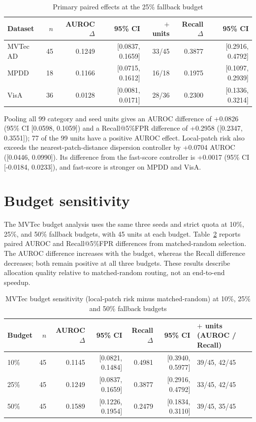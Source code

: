 \documentclass[pdflatex,sn-basic,Numbered]{sn-jnl}
\begin{document}
\begin{table}[ht]
\caption{Primary paired effects at the 25\% fallback budget}
\label{tab:primary}
\begin{tabularx}{\textwidth}{lrrrrrr}
\toprule
Dataset & $n$ & AUROC $\Delta$ & 95\% CI & $+$ units & Recall $\Delta$ & 95\% CI \\
\midrule
MVTec AD & 45 & 0.1249 & [0.0837, 0.1659] & 33/45 & 0.3877 & [0.2916, 0.4792] \\
MPDD & 18 & 0.1166 & [0.0715, 0.1612] & 16/18 & 0.1975 & [0.1097, 0.2939] \\
VisA & 36 & 0.0128 & [0.0081, 0.0171] & 28/36 & 0.2300 & [0.1336, 0.3214] \\
\bottomrule
\end{tabularx}
\end{table}

Pooling all 99 category and seed units gives an AUROC difference of +0.0826 (95\% CI [0.0598, 0.1059]) and a Recall@5\%FPR difference of +0.2958 ([0.2347, 0.3551]); 77 of the 99 units have a positive AUROC effect. Local-patch risk also exceeds the nearest-patch-distance dispersion controller by +0.0704 AUROC ([0.0446, 0.0990]). Its difference from the fast-score controller is +0.0017 (95\% CI [-0.0184, 0.0233]), and fast-score is stronger on MPDD and VisA.

\section{Budget sensitivity}
The MVTec budget analysis uses the same three seeds and strict quota at 10\%, 25\%, and 50\% fallback budgets, with 45 units at each budget. Table~\ref{tab:budget} reports paired AUROC and Recall@5\%FPR differences from matched-random selection. The AUROC difference increases with the budget, whereas the Recall difference decreases; both remain positive at all three budgets. These results describe allocation quality relative to matched-random routing, not an end-to-end speedup.

\begin{table}[ht]
\caption{MVTec budget sensitivity (local-patch risk minus matched-random) at 10\%, 25\% and 50\% fallback budgets}
\label{tab:budget}
\begin{tabularx}{\textwidth}{lrrrrrX}
\toprule
Budget & $n$ & AUROC $\Delta$ & 95\% CI & Recall $\Delta$ & 95\% CI & $+$ units (AUROC / Recall) \\
\midrule
10\% & 45 & 0.1145 & [0.0821, 0.1484] & 0.4981 & [0.3940, 0.5977] & 39/45, 42/45 \\
25\% & 45 & 0.1249 & [0.0837, 0.1659] & 0.3877 & [0.2916, 0.4792] & 33/45, 42/45 \\
50\% & 45 & 0.1589 & [0.1226, 0.1954] & 0.2479 & [0.1834, 0.3110] & 39/45, 35/45 \\
\bottomrule
\end{tabularx}
\end{table}
\end{document}
